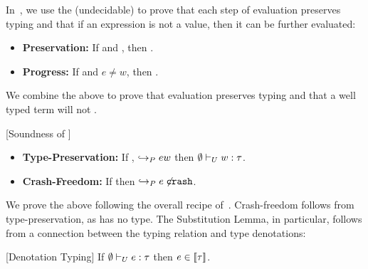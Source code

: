 In~\cite{vazou14techrep}, we use the (undecidable) \rsubbase to prove that each step 
of evaluation preserves typing and that if an expression
is not a value, then it can be further evaluated:
%
\begin{itemize}
\item\textbf{Preservation:} 
	If  and , 
	then . 
\item\textbf{Progress:}
	If  and $e \not = w$,
	then . 
\end{itemize}
%
We combine the above to prove that evaluation preserves 
typing and that a well typed term will not \ecrash.
%
\begin{theorem}{[Soundness of \undeclang]}\label{thm:refinedhaskell:safety}
\begin{itemize}
\item\textbf{Type-Preservation:} If , %
       $\hookrightarrow_P {e}{w}$ then $\emptyset \vdash_U w:\tau$.
\item\textbf{Crash-Freedom:} If  
        then $\hookrightarrow_P {e\not}{\mathtt{crash}}$.
\end{itemize}
\end{theorem}

We prove the above following the overall recipe of~\cite{Knowles10}. 
Crash-freedom follows from type-preservation, as \ecrash has no type.
%
The Substitution Lemma, in particular, follows from a connection between
the typing relation and type denotations:

\begin{lemma}{[Denotation Typing]}\label{lem:denotation}
If $\emptyset \vdash_U e:\tau$ then $e \in [\![\tau]\!]$.
\end{lemma} 


